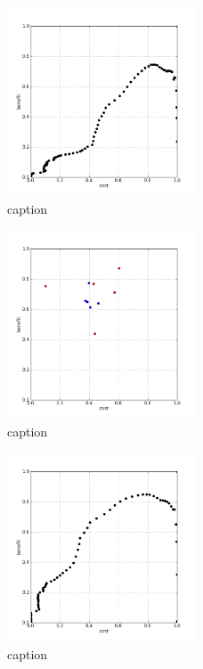 %
\begin{figure}[!ht]
	\centering
	\includegraphics[width=0.5\textwidth]{img/p1figs/computeFrameStateContrastOnly_simpleCompare_smooth12_tol0_AUC.png}
	\caption{caption}
\end{figure}
%
\begin{figure}[!ht]
	\centering
	\includegraphics[width=0.5\textwidth]{img/p1figs/computeFrameStateCubic_sectionCompareBetter_smooth0_tol12.png}
	\caption{caption}
\end{figure}
%
\begin{figure}[!ht]
	\centering
	\includegraphics[width=0.5\textwidth]{img/p1figs/computeFrameStateCubic_sectionCompareBetter_smooth0_tol12_AUC.png}
	\caption{caption}
\end{figure}
